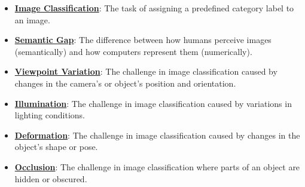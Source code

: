 \documentclass{article}%
\begin{document}
\begin{itemize}[leftmargin=*]%
\item \href{https://purdue.brightspace.com/d2l/common/assets/pdfjs-d2l-dist/1.0.14-legacy/web/viewer.html?file=%2Fcontent%2Fenforced%2F1095467-wl.202510.CS.24300.001%2F07L2-Vision.pdf%3Fou%3D1095467&lang=en-us&container=d2l-fileviewer-rendered-pdf&fullscreen=d2l-fileviewer-rendered-pdf-dialog&height=667#page=3}{\textbf{Image Classification}}: The task of assigning a predefined category label to an image.%
\item \href{https://purdue.brightspace.com/d2l/common/assets/pdfjs-d2l-dist/1.0.14-legacy/web/viewer.html?file=%2Fcontent%2Fenforced%2F1095467-wl.202510.CS.24300.001%2F07L2-Vision.pdf%3Fou%3D1095467&lang=en-us&container=d2l-fileviewer-rendered-pdf&fullscreen=d2l-fileviewer-rendered-pdf-dialog&height=667#page=4}{\textbf{Semantic Gap}}: The difference between how humans perceive images (semantically) and how computers represent them (numerically).%
\item \href{https://purdue.brightspace.com/d2l/common/assets/pdfjs-d2l-dist/1.0.14-legacy/web/viewer.html?file=%2Fcontent%2Fenforced%2F1095467-wl.202510.CS.24300.001%2F07L2-Vision.pdf%3Fou%3D1095467&lang=en-us&container=d2l-fileviewer-rendered-pdf&fullscreen=d2l-fileviewer-rendered-pdf-dialog&height=667#page=6}{\textbf{Viewpoint Variation}}: The challenge in image classification caused by changes in the camera's or object's position and orientation.%
\item \href{https://purdue.brightspace.com/d2l/common/assets/pdfjs-d2l-dist/1.0.14-legacy/web/viewer.html?file=%2Fcontent%2Fenforced%2F1095467-wl.202510.CS.24300.001%2F07L2-Vision.pdf%3Fou%3D1095467&lang=en-us&container=d2l-fileviewer-rendered-pdf&fullscreen=d2l-fileviewer-rendered-pdf-dialog&height=667#page=7}{\textbf{Illumination}}: The challenge in image classification caused by variations in lighting conditions.%
\item \href{https://purdue.brightspace.com/d2l/common/assets/pdfjs-d2l-dist/1.0.14-legacy/web/viewer.html?file=%2Fcontent%2Fenforced%2F1095467-wl.202510.CS.24300.001%2F07L2-Vision.pdf%3Fou%3D1095467&lang=en-us&container=d2l-fileviewer-rendered-pdf&fullscreen=d2l-fileviewer-rendered-pdf-dialog&height=667#page=8}{\textbf{Deformation}}: The challenge in image classification caused by changes in the object's shape or pose.%
\item \href{https://purdue.brightspace.com/d2l/common/assets/pdfjs-d2l-dist/1.0.14-legacy/web/viewer.html?file=%2Fcontent%2Fenforced%2F1095467-wl.202510.CS.24300.001%2F07L2-Vision.pdf%3Fou%3D1095467&lang=en-us&container=d2l-fileviewer-rendered-pdf&fullscreen=d2l-fileviewer-rendered-pdf-dialog&height=667#page=9}{\textbf{Occlusion}}: The challenge in image classification where parts of an object are hidden or obscured.%

\end{itemize}
\end{document}
